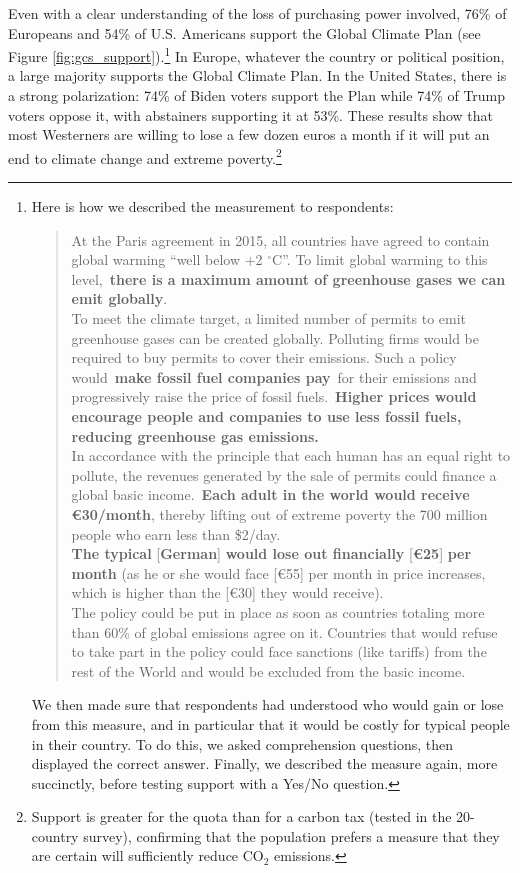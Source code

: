 \documentclass[a5paper,english,openany]{memoir}
\begin{document}
Even with a clear understanding of the loss of purchasing power involved, 76\% of Europeans and 54\% of U.S. Americans support the Global Climate Plan (see Figure \ref{fig:gcs_support}).\footnote{\label{fn15}
Here is how we described the measurement to respondents:
\begin{quote}
At the Paris agreement in 2015, all countries have agreed to contain global warming ``well below +2 $\mathrm{{}^\circ}$C''. To limit global warming to this level,~\textbf{there is a maximum amount of greenhouse gases we can emit globally}.\\
To meet the climate target, a limited number of permits to emit greenhouse gases can be created globally. Polluting firms would be required to buy permits to cover their emissions. Such a policy would~\textbf{make fossil fuel companies pay}~for their emissions and progressively raise the price of fossil fuels.~\textbf{Higher prices would encourage people and companies to use less fossil fuels, reducing greenhouse gas emissions.}\\
In accordance with the principle that each human has an equal right to pollute, the revenues generated by the sale of permits could finance a global basic income.~\textbf{Each adult in the world would receive } \textbf{\euro{}30/month}, thereby lifting out of extreme poverty the 700 million people who earn less than \$2/day.\\
\textbf{The typical }[\textbf{German}]\textbf{ would lose out financially }[\textbf{\euro{}25}]\textbf{ per month}\footnotemark{\label{fn16}} (as he or she would face [\euro{}55] per month in price increases, which is higher than the [\euro{}30] they would receive). 
\\The policy could be put in place as soon as countries totaling more than 60\% of global emissions agree on it. Countries that would refuse to take part in the policy could face sanctions (like tariffs) from the rest of the World and would be excluded from the basic income.
\end{quote}
We then made sure that respondents had understood who would gain or lose from this measure, and in particular that it would be costly for typical people in their country. To do this, we asked comprehension questions, then displayed the correct answer. Finally, we described the measure again, more succinctly, before testing support with a Yes/No question.} 
In Europe, whatever the country or political position, a large majority supports the Global Climate Plan. 
In the United States, there is a strong polarization: 74\% of Biden voters support the Plan while 74\% of Trump voters oppose it, with abstainers supporting it at 53\%.  
These results show that most Westerners are willing to lose a few dozen euros a month if it will put an end to climate change and extreme poverty.\footnote{Support is greater for the quota than for a carbon tax (tested in the 20-country survey), confirming that the population prefers a measure that they are certain will sufficiently reduce CO$_\text{2}$ emissions.}
\end{document}
